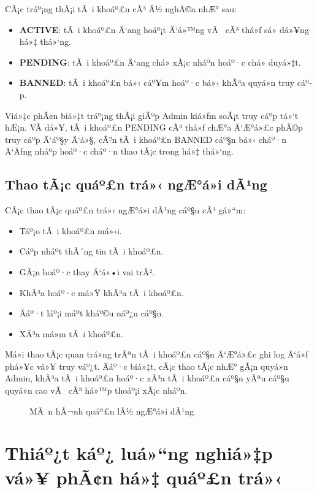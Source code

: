 ﻿\documentclass[12pt,a4paper]{report}
\begin{document}
CÃ¡c tráº¡ng thÃ¡i tÃ i khoáº£n cÃ³ Ã½ nghÄ©a nhÆ° sau:

\begin{itemize}
    \item \textbf{ACTIVE}: tÃ i khoáº£n Ä‘ang hoáº¡t Ä‘á»™ng vÃ  cÃ³ thá»ƒ sá»­ dá»¥ng há»‡ thá»‘ng.
    \item \textbf{PENDING}: tÃ i khoáº£n Ä‘ang chá» xÃ¡c nháº­n hoáº·c chá» duyá»‡t.
    \item \textbf{BANNED}: tÃ i khoáº£n bá»‹ cáº¥m hoáº·c bá»‹ khÃ³a quyá»n truy cáº­p.
\end{itemize}

Viá»‡c phÃ¢n biá»‡t tráº¡ng thÃ¡i giÃºp Admin kiá»ƒm soÃ¡t truy cáº­p tá»‘t hÆ¡n. VÃ­ dá»¥, tÃ i khoáº£n PENDING cÃ³ thá»ƒ chÆ°a Ä‘Æ°á»£c phÃ©p truy cáº­p Ä‘áº§y Ä‘á»§, cÃ²n tÃ i khoáº£n BANNED cáº§n bá»‹ cháº·n Ä‘Äƒng nháº­p hoáº·c cháº·n thao tÃ¡c trong há»‡ thá»‘ng.

\subsection{Thao tÃ¡c quáº£n trá»‹ ngÆ°á»i dÃ¹ng}

CÃ¡c thao tÃ¡c quáº£n trá»‹ ngÆ°á»i dÃ¹ng cáº§n cÃ³ gá»“m:

\begin{itemize}
    \item Táº¡o tÃ i khoáº£n má»›i.
    \item Cáº­p nháº­t thÃ´ng tin tÃ i khoáº£n.
    \item GÃ¡n hoáº·c thay Ä‘á»•i vai trÃ².
    \item KhÃ³a hoáº·c má»Ÿ khÃ³a tÃ i khoáº£n.
    \item Äáº·t láº¡i máº­t kháº©u náº¿u cáº§n.
    \item XÃ³a má»m tÃ i khoáº£n.
\end{itemize}

Má»i thao tÃ¡c quan trá»ng trÃªn tÃ i khoáº£n cáº§n Ä‘Æ°á»£c ghi log Ä‘á»ƒ phá»¥c vá»¥ truy váº¿t. Äáº·c biá»‡t, cÃ¡c thao tÃ¡c nhÆ° gÃ¡n quyá»n Admin, khÃ³a tÃ i khoáº£n hoáº·c xÃ³a tÃ i khoáº£n cáº§n yÃªu cáº§u quyá»n cao vÃ  cÃ³ há»™p thoáº¡i xÃ¡c nháº­n.

\begin{figure}[H]
    \centering
    \caption{MÃ n hÃ¬nh quáº£n lÃ½ ngÆ°á»i dÃ¹ng}
    \label{fig:users-management}
\end{figure}

\section{Thiáº¿t káº¿ luá»“ng nghiá»‡p vá»¥ phÃ¢n há»‡ quáº£n trá»‹}
\end{document}
